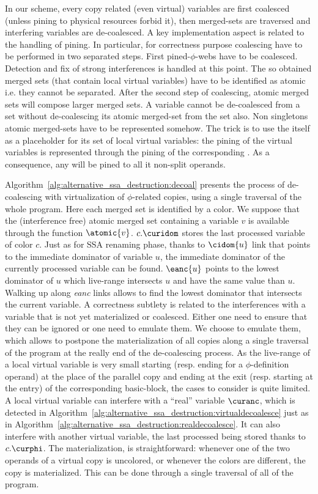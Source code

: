In our scheme, every copy related (even virtual) variables are first coalesced (unless pining to physical resources forbid it), then merged-sets are traversed and interfering variables are de-coalesced.
A key implementation aspect is related to the handling of pining. In particular, for correctness purpose coalescing have to be performed in two separated steps. First pined-$\phi$-webs have to be coalesced. Detection and fix of strong interferences is handled at this point. The so obtained merged sets (that contain local virtual variables) have to be identified as atomic i.e. they cannot be separated. After the second step of coalescing, atomic merged sets will compose larger merged sets. A variable cannot be de-coalesced from a set without de-coalescing its atomic merged-set from the set also. Non singletons atomic merged-sets have to be represented somehow. The trick is to use the \phifun itself as a placeholder for its set of local virtual variables: the pining of the virtual variables is represented through the pining of the corresponding \phifun. As a consequence, any \phifun will be pined to all it non-split operands. 

Algorithm~\ref{alg:alternative_ssa_destruction:decoal} presents the process of de-coalescing with virtualization of $\phi$-related copies, using a single traversal of the whole program. Here each merged set is identified by a color. We suppose that the (interference free) atomic merged set containing a variable $v$ is available through the function $\atomic{v}$. $c.\curidom$ stores the last processed variable of color $c$. Just as for SSA renaming phase, thanks to $\cidom{u}$ link that points to the immediate dominator of variable $u$, the immediate dominator of the currently processed variable can be found. $\eanc{u}$ points to the lowest dominator of $u$ which live-range intersects $u$ and have the same value than $u$. Walking up along \textit{eanc} links allows to find the lowest dominator that intersects the current variable. 
A correctness subtlety is related to the interferences with a variable that is not yet materialized or coalesced. Either one need to ensure that they can be ignored or one need to emulate them. We choose to emulate them, which allows to postpone the materialization of all copies along a single traversal of the program at the really end of the de-coalescing process. As the live-range of a local virtual variable is very small starting (resp. ending for a $\phi$-definition operand) at the place of the parallel copy and ending at the exit (resp. starting at the entry) of the corresponding basic-block, the cases to consider is quite limited. A local virtual variable can interfere with a ``real'' variable $\curanc$, which is detected in Algorithm~\ref{alg:alternative_ssa_destruction:virtualdecoalesce} just as in Algorithm~\ref{alg:alternative_ssa_destruction:realdecoalesce}. It can also interfere with another virtual variable, the last processed being stored thanks to $c.\curphi$.
The materialization, is straightforward: whenever one of the two operands of a virtual copy is uncolored, or whenever the colors are different, the copy is materialized. This can be done through a single traversal of all \phifuns of the program.





